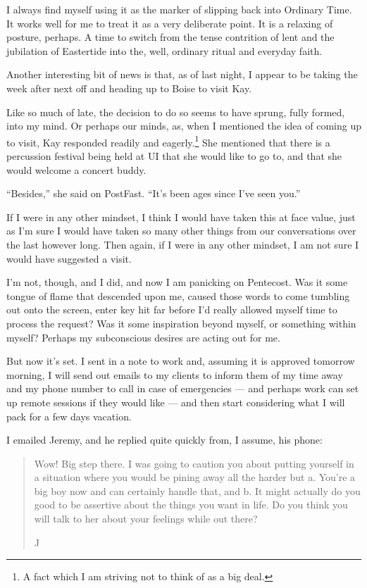 I always find myself using it as the marker of slipping back into Ordinary Time. It works well for me to treat it as a very deliberate point. It is a relaxing of posture, perhaps. A time to switch from the tense contrition of lent and the jubilation of Eastertide into the, well, ordinary ritual and everyday faith.

Another interesting bit of news is that, as of last night, I appear to be taking the week after next off and heading up to Boise to visit Kay.

Like so much of late, the decision to do so seems to have sprung, fully formed, into my mind. Or perhaps our minds, as, when I mentioned the idea of coming up to visit, Kay responded readily and eagerly.\footnote{A fact which I am striving not to think of as a big deal.} She mentioned that there is a percussion festival being held at UI that she would like to go to, and that she would welcome a concert buddy.

``Besides,'' she said on PostFast. ``It's been ages since I've seen you.''

If I were in any other mindset, I think I would have taken this at face value, just as I'm sure I would have taken so many other things from our conversations over the last however long. Then again, if I were in any other mindset, I am not sure I would have suggested a visit.

I'm not, though, and I did, and now I am panicking on Pentecost. Was it some tongue of flame that descended upon me, caused those words to come tumbling out onto the screen, enter key hit far before I'd really allowed myself time to process the request? Was it some inspiration beyond myself, or something within myself? Perhaps my subconscious desires are acting out for me.

But now it's set. I sent in a note to work and, assuming it is approved tomorrow morning, I will send out emails to my clients to inform them of my time away and my phone number to call in case of emergencies --- and perhaps work can set up remote sessions if they would like --- and then start considering what I will pack for a few days vacation.

I emailed Jeremy, and he replied quite quickly from, I assume, his phone:

\begin{quote}
Wow! Big step there. I was going to caution you about putting yourself in a situation where you would be pining away all the harder but a. You're a big boy now and can certainly handle that, and b. It might actually do you good to be assertive about the things you want in life. Do you think you will talk to her about your feelings while out there?

J
\end{quote}

